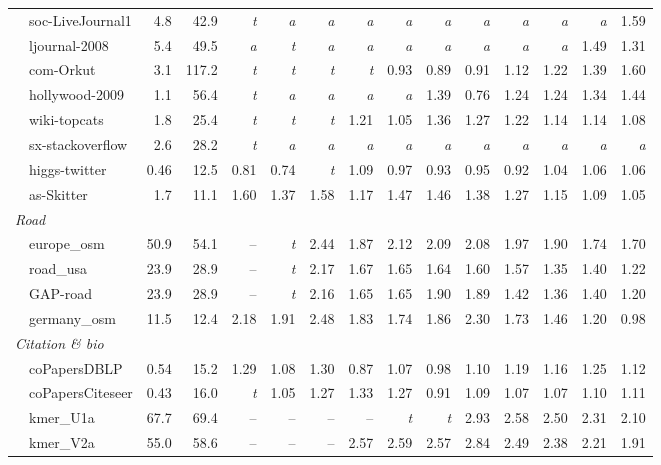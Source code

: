 \documentclass[11pt]{article}
\begin{document}
\begin{table}[t]
\begin{tabular}{lrrrrrrrrrrrrr}
~~soc-LiveJournal1 & 4.8 & 42.9 & \emph{t} & \emph{a} & \emph{a} & \emph{a} & \emph{a} & \emph{a} & \emph{a} & \emph{a} & \emph{a} & \emph{a} & 1.59 \\
~~ljournal-2008 & 5.4 & 49.5 & \emph{a} & \emph{t} & \emph{a} & \emph{a} & \emph{a} & \emph{a} & \emph{a} & \emph{a} & \emph{a} & 1.49 & 1.31 \\
~~com-Orkut & 3.1 & 117.2 & \emph{t} & \emph{t} & \emph{t} & \emph{t} & 0.93 & 0.89 & 0.91 & 1.12 & 1.22 & 1.39 & 1.60 \\
~~hollywood-2009 & 1.1 & 56.4 & \emph{t} & \emph{a} & \emph{a} & \emph{a} & \emph{a} & 1.39 & 0.76 & 1.24 & 1.24 & 1.34 & 1.44 \\
~~wiki-topcats & 1.8 & 25.4 & \emph{t} & \emph{t} & \emph{t} & 1.21 & 1.05 & 1.36 & 1.27 & 1.22 & 1.14 & 1.14 & 1.08 \\
~~sx-stackoverflow & 2.6 & 28.2 & \emph{t} & \emph{a} & \emph{a} & \emph{a} & \emph{a} & \emph{a} & \emph{a} & \emph{a} & \emph{a} & \emph{a} & \emph{a} \\
~~higgs-twitter & 0.46 & 12.5 & 0.81 & 0.74 & \emph{t} & 1.09 & 0.97 & 0.93 & 0.95 & 0.92 & 1.04 & 1.06 & 1.06 \\
~~as-Skitter & 1.7 & 11.1 & 1.60 & 1.37 & 1.58 & 1.17 & 1.47 & 1.46 & 1.38 & 1.27 & 1.15 & 1.09 & 1.05 \\
\multicolumn{14}{l}{\emph{Road}} \\
~~europe\_osm & 50.9 & 54.1 & -- & \emph{t} & 2.44 & 1.87 & 2.12 & 2.09 & 2.08 & 1.97 & 1.90 & 1.74 & 1.70 \\
~~road\_usa & 23.9 & 28.9 & -- & \emph{t} & 2.17 & 1.67 & 1.65 & 1.64 & 1.60 & 1.57 & 1.35 & 1.40 & 1.22 \\
~~GAP-road & 23.9 & 28.9 & -- & \emph{t} & 2.16 & 1.65 & 1.65 & 1.90 & 1.89 & 1.42 & 1.36 & 1.40 & 1.20 \\
~~germany\_osm & 11.5 & 12.4 & 2.18 & 1.91 & 2.48 & 1.83 & 1.74 & 1.86 & 2.30 & 1.73 & 1.46 & 1.20 & 0.98 \\
\multicolumn{14}{l}{\emph{Citation \& bio}} \\
~~coPapersDBLP & 0.54 & 15.2 & 1.29 & 1.08 & 1.30 & 0.87 & 1.07 & 0.98 & 1.10 & 1.19 & 1.16 & 1.25 & 1.12 \\
~~coPapersCiteseer & 0.43 & 16.0 & \emph{t} & 1.05 & 1.27 & 1.33 & 1.27 & 0.91 & 1.09 & 1.07 & 1.07 & 1.10 & 1.11 \\
~~kmer\_U1a & 67.7 & 69.4 & -- & -- & -- & -- & \emph{t} & \emph{t} & 2.93 & 2.58 & 2.50 & 2.31 & 2.10 \\
~~kmer\_V2a & 55.0 & 58.6 & -- & -- & -- & 2.57 & 2.59 & 2.57 & 2.84 & 2.49 & 2.38 & 2.21 & 1.91 \\

\end{tabular}
\end{table}
\end{document}
